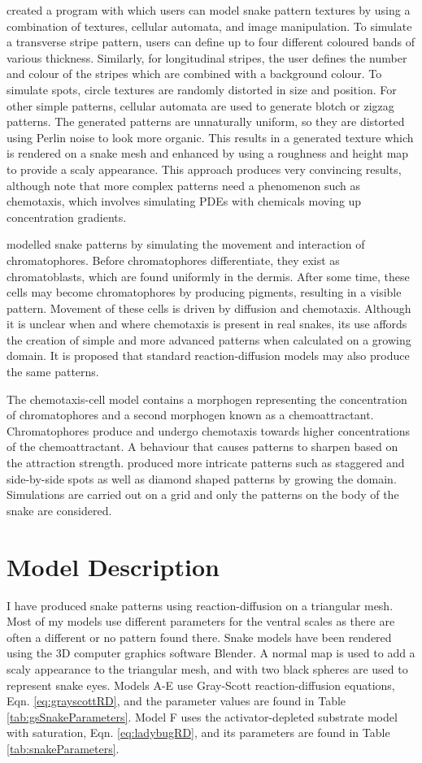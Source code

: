 \citet{pinheiro2017} created a program with which users can model snake pattern textures by using a combination of textures, cellular automata, and image manipulation. To simulate a transverse stripe pattern, users can define up to four different coloured bands of various thickness. Similarly, for longitudinal stripes, the user defines the number and colour of the stripes which are combined with a background colour. To simulate spots, circle textures are randomly distorted in size and position. For other simple patterns, cellular automata are used to generate blotch or zigzag patterns. The generated patterns are unnaturally uniform, so they are distorted using Perlin noise to look more organic. This results in a generated texture which is rendered on a snake mesh and enhanced by using a roughness and height map to provide a scaly appearance. This approach produces very convincing results, although \citet{pinheiro2017} note that more complex patterns need a phenomenon such as chemotaxis, which involves simulating PDEs with chemicals moving up concentration gradients.

\citet{MURRAY1991} modelled snake patterns by simulating the movement and interaction of chromatophores. Before chromatophores differentiate, they exist as chromatoblasts, which are found uniformly in the dermis. After some time, these cells may become chromatophores by producing pigments, resulting in a visible pattern. Movement of these cells is driven by diffusion and chemotaxis. Although it is unclear when and where chemotaxis is present in real snakes, its use affords the creation of simple and more advanced patterns when calculated on a growing domain. It is proposed that standard reaction-diffusion models may also produce the same patterns.

The chemotaxis-cell model contains a morphogen representing the concentration of chromatophores and a second morphogen known as a chemoattractant. Chromatophores produce and undergo chemotaxis towards higher concentrations of the chemoattractant. A behaviour that causes patterns to sharpen based on the attraction strength. \citet{MURRAY1991} produced more intricate patterns such as staggered and side-by-side spots as well as diamond shaped patterns by growing the domain. Simulations are carried out on a grid and only the patterns on the body of the snake are considered.

\section{Model Description}
I have produced snake patterns using reaction-diffusion on a triangular mesh. Most of my models use different parameters for the ventral scales as there are often a different or no pattern found there. Snake models have been rendered using the 3D computer graphics software Blender. A normal map is used to add a scaly appearance to the triangular mesh, and with two black spheres are used to represent snake eyes. Models A-E use Gray-Scott reaction-diffusion equations, Eqn. \ref{eq:grayscottRD}, and the parameter values are found in Table \ref{tab:gsSnakeParameters}. Model F uses the activator-depleted substrate model with saturation, Eqn. \ref{eq:ladybugRD}, and its parameters are found in Table \ref{tab:snakeParameters}.

